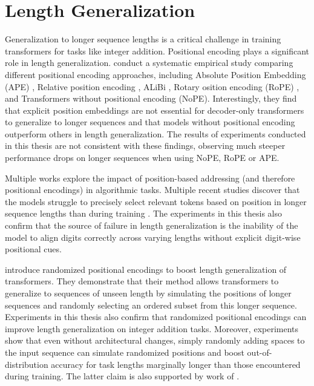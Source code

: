 \section{Length Generalization}\label{sec:sota_length_generalization}

Generalization to longer sequence lengths is a critical challenge in training transformers for tasks like integer addition. Positional encoding plays a significant role in length generalization. \cite{kazemnejad_impact_2023} conduct a systematic empirical study comparing different positional encoding approaches, including Absolute Position Embedding (APE) \parencite{vaswani_attention_2017}, Relative position encoding \parencite{shaw_self-attention_2018}, ALiBi \parencite{press_train_2021}, Rotary osition encoding (RoPE) \parencite{su_roformer_2024}, and Transformers without positional encoding (NoPE). Interestingly, they find that explicit position embeddings are not essential for decoder-only transformers to generalize to longer sequences and that models without positional encoding outperform others in length generalization. The results of experiments conducted in this thesis are not consistent with these findings, observing much steeper performance drops on longer sequences when using NoPE, RoPE or APE.

Multiple works explore the impact of position-based addressing (and therefore positional encodings) in algorithmic tasks. Multiple recent studies discover that the models struggle to precisely select relevant tokens based on position in longer sequence lengths than during training \parencite{ebrahimi_your_2024,shen_positional_2023,zhao_length_2024,zhou_what_2023,yehudai_when_2024}. The experiments in this thesis also confirm that the source of failure in length generalization is the inability of the model to align digits correctly across varying lengths without explicit digit-wise positional cues.

\cite{ruoss_randomized_2023} introduce randomized positional encodings to boost length generalization of transformers. They demonstrate that their method allows transformers to generalize to sequences of unseen length by simulating the positions of longer sequences and randomly selecting an ordered subset from this longer sequence. Experiments in this thesis also confirm that randomized positional encodings can improve length generalization on integer addition tasks. Moreover, experiments show that even without architectural changes, simply randomly adding spaces to the input sequence can simulate randomized positions and boost out-of-distribution accuracy for task lengths marginally longer than those encountered during training. The latter claim is also supported by work of \cite{shen_positional_2023}.

